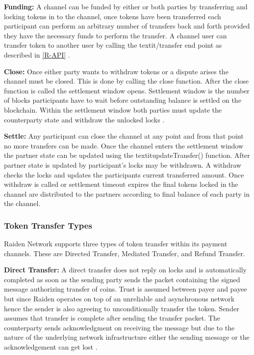 \textbf{Funding:} A channel can be funded by either or both parties by transferring and locking tokens in to the channel, once tokens have been transferred each participant can perform an arbitrary number of transfers back and forth provided they have the necessary funds to perform the transfer. A channel user can transfer token to another user by calling the textit{/transfer} end point as described in \ref{R-API} \cite{rad:001}.

\textbf{Close:} Once either party wants to withdraw tokens or a dispute arises the channel must be closed. This is done by calling the close function. After the close function is called the settlement window opens. Settlement window is the number of blocks participants have to wait before outstanding balance is settled on the blockchain. Within the settlement window both parties must update the counterparty state and withdraw the unlocked locks \cite{rad:001}.

\textbf{Settle:} Any participant can close the channel at any point and from that point no more transfers can be made. Once the channel enters the settlement window the partner state can be updated using the textit{updateTransfer()} function. After partner state is updated by participant’s locks may be withdrawn. A withdraw checks the locks and updates the participants current transferred amount. Once withdraw is called or settlement timeout expires the final tokens locked in the channel are distributed to the partners according to final balance of each party in the channel\cite{rad:001}. 


\subsubsection{Token Transfer Types} \label{RaidenTrans}
Raiden Network supports three types of token transfer within its payment channels. These are Directed Transfer, Mediated Transfer, and Refund Transfer.

\textbf{Direct Transfer:} A direct transfer does not reply on locks and is automatically completed as soon as the sending party sends the packet containing the signed message authorizing transfer of coins. Trust is assumed between payer and payee but since Raiden operates on top of an unreliable and asynchronous network hence the sender is also agreeing to unconditionally transfer the token. Sender assumes that transfer is complete after sending the transfer packet. The counterparty sends acknowledgment on receiving the message but due to the nature of the underlying network infrastructure either the sending message or the acknowledgement can get lost \cite{rad:001}.

